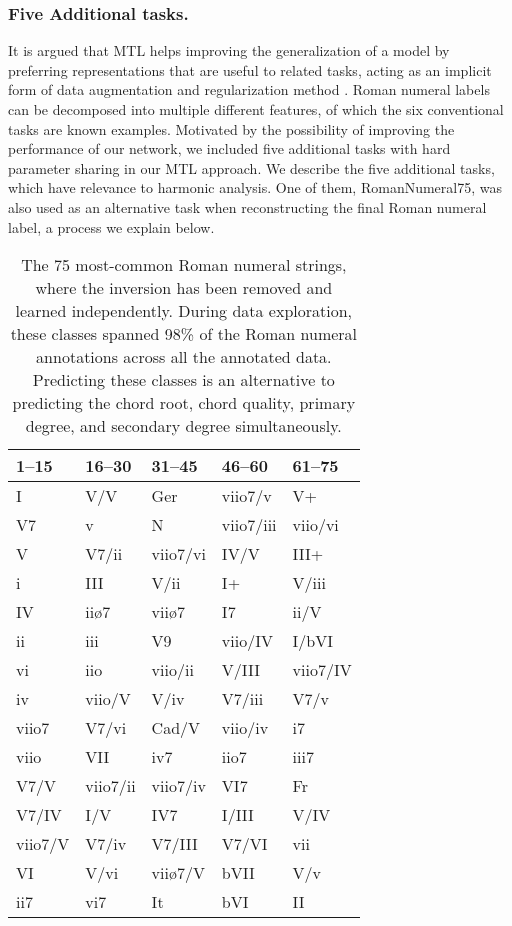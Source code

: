 \documentclass{article}
\begin{document}
\subsubsection{Five Additional tasks.}\label{sec:additionaltasks}

It is argued that MTL helps improving the generalization of a model by preferring representations that are useful to related tasks, acting as an implicit form of data augmentation and regularization method \cite{ruder2017overview}.
Roman numeral labels can be decomposed into multiple different features, of which the six conventional tasks are known examples.
Motivated by the possibility of improving the performance of our network, we included five additional tasks with hard parameter sharing in our MTL approach.
We describe the five additional tasks, which have relevance to harmonic analysis. 
One of them, RomanNumeral75, was also used as an alternative task when reconstructing the final Roman numeral label, a process we explain below.

\begin{table}[]
\begin{tabular}{l|l|l|l|l}
1--15    & 16--30    & 31--45    & 46--60     & 61--75    \\
\hline
I       & V/V      & Ger     & viio7/v   & V+       \\
V7      & v        & N        & viio7/iii & viio/vi  \\
V       & V7/ii    & viio7/vi & IV/V      & III+     \\
i       & III      & V/ii     & I+        & V/iii    \\
IV      & iiø7     & viiø7    & I7        & ii/V     \\
ii      & iii      & V9       & viio/IV   & I/bVI    \\
vi      & iio      & viio/ii  & V/III     & viio7/IV \\
iv      & viio/V   & V/iv     & V7/iii    & V7/v     \\
viio7   & V7/vi    & Cad/V    & viio/iv   & i7       \\
viio    & VII      & iv7      & iio7      & iii7     \\
V7/V    & viio7/ii & viio7/iv & VI7       & Fr      \\
V7/IV   & I/V      & IV7      & I/III     & V/IV     \\
viio7/V & V7/iv    & V7/III   & V7/VI     & vii      \\
VI      & V/vi     & viiø7/V  & bVII      & V/v      \\
ii7     & vi7      & It       & bVI       & II      
\end{tabular}
\caption{The 75 most-common Roman numeral strings, where the inversion has been removed and learned independently. During data exploration, these classes spanned 98\% of the Roman numeral annotations across all the annotated data. Predicting these classes is an alternative to predicting the chord root, chord quality, primary degree, and secondary degree simultaneously.}
\label{tab:top75rn}
\end{table}
\end{document}

